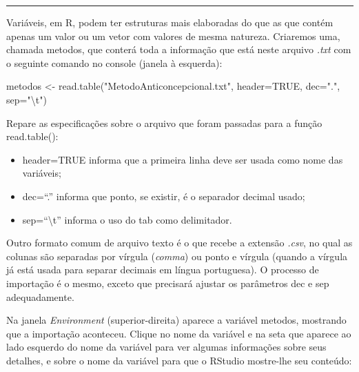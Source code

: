 \documentclass[
]{article}
\newenvironment{Shaded}{\begin{snugshade}}{\end{snugshade}}
\newcommand{\AttributeTok}[1]{\textcolor[rgb]{0.77,0.63,0.00}{#1}}
\newcommand{\ConstantTok}[1]{\textcolor[rgb]{0.00,0.00,0.00}{#1}}
\newcommand{\FunctionTok}[1]{\textcolor[rgb]{0.00,0.00,0.00}{#1}}
\newcommand{\NormalTok}[1]{#1}
\newcommand{\OtherTok}[1]{\textcolor[rgb]{0.56,0.35,0.01}{#1}}
\newcommand{\SpecialCharTok}[1]{\textcolor[rgb]{0.00,0.00,0.00}{#1}}
\newcommand{\StringTok}[1]{\textcolor[rgb]{0.31,0.60,0.02}{#1}}
\providecommand{\tightlist}{%
  \setlength{\itemsep}{0pt}\setlength{\parskip}{0pt}}
\begin{document}
\begin{center}\rule{0.5\linewidth}{0.5pt}\end{center}

Variáveis, em R, podem ter estruturas mais elaboradas do que as que
contém apenas um valor ou um vetor com valores de mesma natureza.
Criaremos uma, chamada metodos, que conterá toda a informação que está
neste arquivo \emph{.txt} com o seguinte comando no console (janela à
esquerda):

\begin{Shaded}
\begin{Highlighting}[]
\NormalTok{metodos }\OtherTok{\textless{}{-}} \FunctionTok{read.table}\NormalTok{(}\StringTok{"MetodoAnticoncepcional.txt"}\NormalTok{, }
                         \AttributeTok{header=}\ConstantTok{TRUE}\NormalTok{,  }\AttributeTok{dec=}\StringTok{"."}\NormalTok{, }\AttributeTok{sep=}\StringTok{"}\SpecialCharTok{\textbackslash{}t}\StringTok{"}\NormalTok{)}
\end{Highlighting}
\end{Shaded}

Repare as especificações sobre o arquivo que foram passadas para a
função read.table():

\begin{itemize}
\tightlist
\item
  header=TRUE informa que a primeira linha deve ser usada como nome das
  variáveis;
\item
  dec=``.'' informa que ponto, se existir, é o separador decimal usado;
\item
  sep=``\textbackslash t'' informa o uso do tab como delimitador.
\end{itemize}

Outro formato comum de arquivo texto é o que recebe a extensão
\emph{.csv}, no qual as colunas são separadas por vírgula (\emph{comma})
ou ponto e vírgula (quando a vírgula já está usada para separar decimais
em língua portuguesa). O processo de importação é o mesmo, exceto que
precisará ajustar os parâmetros dec e sep adequadamente.

Na janela \emph{Environment} (superior-direita) aparece a variável
metodos, mostrando que a importação aconteceu. Clique no nome da
variável e na seta que aparece ao lado esquerdo do nome da variável para
ver algumas informações sobre seus detalhes, e sobre o nome da variável
para que o RStudio mostre-lhe seu conteúdo:
\end{document}
